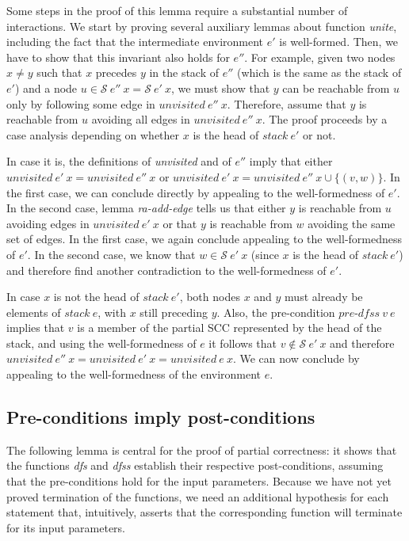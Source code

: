 \documentclass[sigplan,10pt,anonymous,review]{acmart}
\newcommand{\prog}[1]{\textit{#1}}
\renewcommand{\SS}{\mathcal{S}}
\begin{document}
Some steps in the proof of this lemma require a substantial number of interactions. We start by proving several auxiliary lemmas about function \prog{unite}, including the fact that the intermediate environment $e'$ is well-formed. Then, we have to show that this invariant also holds for $e''$. For example, given two nodes $x \neq y$ such that $x$ precedes $y$ in the stack of $e''$ (which is the same as the stack of $e'$) and a node $u \in \SS~e''~x = \SS~e'~x$, we must show that $y$ can be reachable from $u$ only by following some edge in $\prog{unvisited}~e''~x$. Therefore, assume that $y$ is reachable from $u$ avoiding all edges in $\prog{unvisited}~e''~x$. The proof proceeds by a case analysis depending on whether $x$ is the head of $\prog{stack}~e'$ or not.

In case it is, the definitions of \prog{unvisited} and of $e''$ imply that either $\prog{unvisited}~e'~x = \prog{unvisited}~e''~x$ or $\prog{unvisited}~e'~x = \prog{unvisited}~e''~x \cup \{(v,w)\}$. In the first case, we can conclude directly by appealing to the well-formedness of $e'$. In the second case, lemma \prog{ra-add-edge} tells us that either $y$ is reachable from $u$ avoiding edges in $\prog{unvisited}~e'~x$ or that $y$ is reachable from $w$ avoiding the same set of edges. In the first case, we again conclude appealing to the well-formedness of $e'$. In the second case, we know that $w \in \SS~e'~x$ (since $x$ is the head of $\prog{stack}~e'$) and therefore find another contradiction to the well-formedness of $e'$.

In case $x$ is not the head of $\prog{stack}~e'$, both nodes $x$ and $y$ must already be elements of $\prog{stack}~e$, with $x$ still preceding $y$. Also, the pre-condition $\prog{pre-dfss}~v~e$ implies that $v$ is a member of the partial SCC represented by the head of the stack, and using the well-formedness of $e$ it follows that $v \notin \SS~e'~x$ and therefore $\prog{unvisited}~e''~x = \prog{unvisited}~e'~x = \prog{unvisited}~e~x$. We can now conclude by appealing to the well-formedness of the environment $e$.


\subsection{Pre-conditions imply post-conditions}
\label{sec:pre-post}

The following lemma is central for the proof of partial correctness: it shows that the functions \prog{dfs} and \prog{dfss} establish their respective post-conditions, assuming that the pre-conditions hold for the input parameters. Because we have not yet proved termination of the functions, we need an additional hypothesis for each statement that, intuitively, asserts that the corresponding function will terminate for its input parameters.
\end{document}
